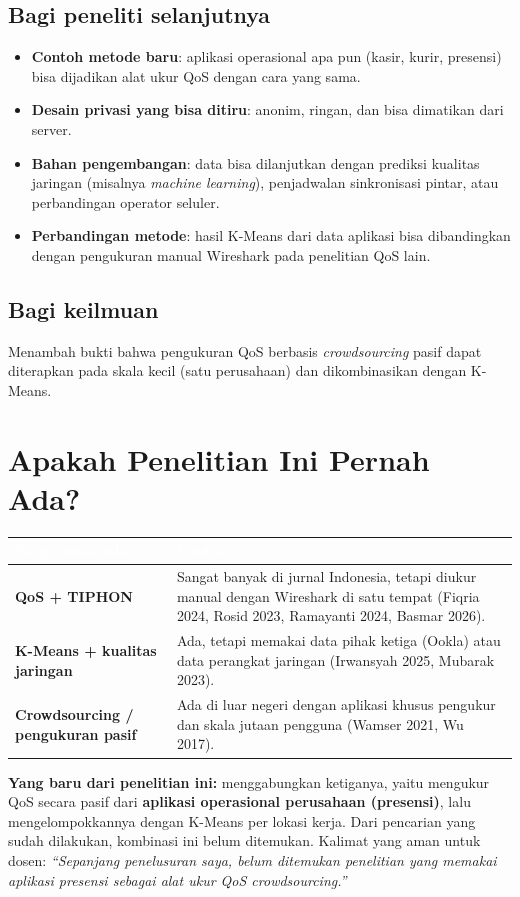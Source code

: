 \documentclass[11pt,a4paper]{article}
\newcommand{\term}[1]{\cellcolor{band}\textbf{#1}}
\newcommand{\kepala}[2]{\rowcolor{head}\textcolor{white}{\textbf{#1}} & \textcolor{white}{\textbf{#2}}\\ \midrule}
\begin{document}
\subsection{Bagi peneliti selanjutnya}
\begin{itemize}
\item \textbf{Contoh metode baru}: aplikasi operasional apa pun (kasir, kurir, presensi) bisa dijadikan alat ukur QoS dengan cara yang sama.
\item \textbf{Desain privasi yang bisa ditiru}: anonim, ringan, dan bisa dimatikan dari server.
\item \textbf{Bahan pengembangan}: data bisa dilanjutkan dengan prediksi kualitas jaringan (misalnya \textit{machine learning}), penjadwalan sinkronisasi pintar, atau perbandingan operator seluler.
\item \textbf{Perbandingan metode}: hasil K-Means dari data aplikasi bisa dibandingkan dengan pengukuran manual Wireshark pada penelitian QoS lain.
\end{itemize}
\subsection{Bagi keilmuan}
Menambah bukti bahwa pengukuran QoS berbasis \textit{crowdsourcing} pasif dapat diterapkan pada skala kecil (satu perusahaan) dan dikombinasikan dengan K-Means.

\section{Apakah Penelitian Ini Pernah Ada?}
\begin{longtable}{KV}
\toprule
\kepala{Yang sudah ada}{Contoh}
\endhead
\term{QoS + TIPHON} & Sangat banyak di jurnal Indonesia, tetapi diukur manual dengan Wireshark di satu tempat (Fiqria 2024, Rosid 2023, Ramayanti 2024, Basmar 2026). \\
\term{K-Means + kualitas jaringan} & Ada, tetapi memakai data pihak ketiga (Ookla) atau data perangkat jaringan (Irwansyah 2025, Mubarak 2023). \\
\term{Crowdsourcing / pengukuran pasif} & Ada di luar negeri dengan aplikasi khusus pengukur dan skala jutaan pengguna (Wamser 2021, Wu 2017). \\
\bottomrule
\end{longtable}
\textbf{Yang baru dari penelitian ini:} menggabungkan ketiganya, yaitu mengukur QoS secara pasif dari \textbf{aplikasi operasional perusahaan (presensi)}, lalu mengelompokkannya dengan K-Means per lokasi kerja. Dari pencarian yang sudah dilakukan, kombinasi ini belum ditemukan. Kalimat yang aman untuk dosen: \textit{``Sepanjang penelusuran saya, belum ditemukan penelitian yang memakai aplikasi presensi sebagai alat ukur QoS crowdsourcing.''}
\end{document}

